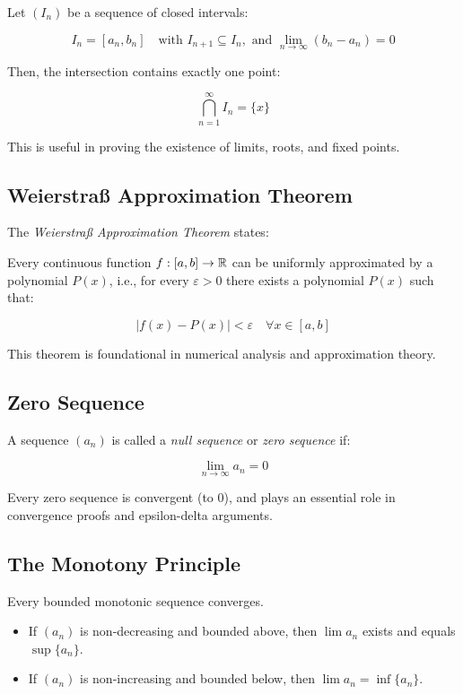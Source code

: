 Let \((I_n)\) be a sequence of closed intervals:

\[
    I_n = [a_n, b_n] \quad \text{with } I_{n+1} \subseteq I_n, \text{ and } \lim_{n \to \infty} (b_n - a_n) = 0
\]

Then, the intersection contains exactly one point:

\[
    \bigcap_{n=1}^{\infty} I_n = \{x\}
\]

This is useful in proving the existence of limits, roots, and fixed points.

\subsection{Weierstraß Approximation Theorem}

The \emph{Weierstraß Approximation Theorem} states:

Every continuous function \(f: [a, b] \rightarrow \mathbb{R}\) can be uniformly approximated by a 
polynomial \(P(x)\), i.e., for every \(\varepsilon > 0\) there exists a polynomial \(P(x)\) such that:

\[
    |f(x) - P(x)| < \varepsilon \quad \forall x \in [a, b]
\]

This theorem is foundational in numerical analysis and approximation theory.

\subsection{Zero Sequence}

A sequence \((a_n)\) is called a \emph{null sequence} or \emph{zero sequence} if:

\[
    \lim_{n \to \infty} a_n = 0
\]

Every zero sequence is convergent (to 0), and plays an essential role in convergence proofs and 
epsilon-delta arguments.

\subsection{The Monotony Principle}

Every bounded monotonic sequence converges.

\begin{itemize}

    \item If \((a_n)\) is non-decreasing and bounded above, then \(\lim a_n\) exists and equals 
    \(\sup \{a_n\}\).

    \item If \((a_n)\) is non-increasing and bounded below, then \(\lim a_n = \inf \{a_n\}\).

\end{itemize}

